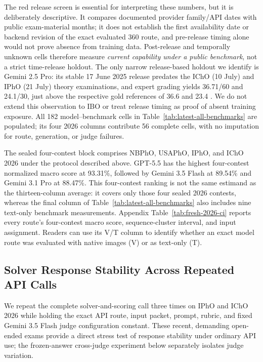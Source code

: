 \documentclass[11pt]{article}
\begin{document}
The red release screen is essential for interpreting these numbers, but it is deliberately descriptive.
It compares documented provider family/API dates with public exam-material months; it does not establish the first availability date or backend revision of the exact evaluated 360 route, and pre-release timing alone would not prove absence from training data.
Post-release and temporally unknown cells therefore measure \emph{current capability under a public benchmark}, not a strict time-release holdout.
The only narrow release-based holdout we identify is Gemini 2.5 Pro: its stable 17 June 2025 release predates the IChO (10 July) and IPhO (21 July) theory examinations, and expert grading yields 36.71/60 and 24.1/30, just above the respective gold references of 36.6 and 23.4 \citep{google_gemini25_stable_2025,icho2025_official_program,ipho2025_official_schedule}.
We do not extend this observation to IBO or treat release timing as proof of absent training exposure.
All 182 model--benchmark cells in Table~\ref{tab:latest-all-benchmarks} are populated; its four 2026 columns contribute 56 complete cells, with no imputation for route, generation, or judge failures.

The sealed four-contest block comprises NBPhO, USAPhO, IPhO, and IChO 2026 under the protocol described above.
GPT-5.5 has the highest four-contest normalized macro score at 93.31\%, followed by Gemini 3.5 Flash at 89.54\% and Gemini 3.1 Pro at 88.47\%.
This four-contest ranking is not the same estimand as the thirteen-column average: it covers only those four sealed 2026 contests, whereas the final column of Table~\ref{tab:latest-all-benchmarks} also includes nine text-only benchmark measurements.
Appendix Table~\ref{tab:fresh-2026-ci} reports every route's four-contest macro score, sequence-cluster interval, and input assignment. Readers can use its V/T column to identify whether an exact model route was evaluated with native images (V) or as text-only (T).

\subsection{Solver Response Stability Across Repeated API Calls}
We repeat the complete solver-and-scoring call three times on IPhO and IChO 2026 while holding the exact API route, input packet, prompt, rubric, and fixed Gemini 3.5 Flash judge configuration constant. These recent, demanding open-ended exams provide a direct stress test of response stability under ordinary API use; the frozen-answer cross-judge experiment below separately isolates judge variation.
\end{document}
